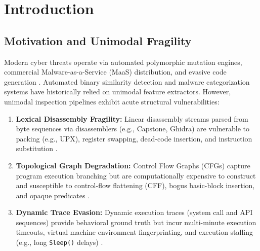 \documentclass[pdflatex,sn-mathphys-num]{sn-jnl}
\begin{document}
\section{Introduction}\label{sec:intro}

\subsection{Motivation and Unimodal Fragility}\label{sec:intro_motivation}
Modern cyber threats operate via automated polymorphic mutation engines, commercial Malware-as-a-Service (MaaS) distribution, and evasive code generation \cite{Gibert2020,Ni2018,Kim2023Revisiting,BinCola2024}. Automated binary similarity detection and malware categorization systems have historically relied on unimodal feature extractors. However, unimodal inspection pipelines exhibit acute structural vulnerabilities:
\begin{enumerate}
    \item \textbf{Lexical Disassembly Fragility:} Linear disassembly streams parsed from byte sequences via disassemblers (e.g., Capstone, Ghidra) are vulnerable to packing (e.g., UPX), register swapping, dead-code insertion, and instruction substitution \cite{Borello2014,Kim2023Revisiting,Tay2022Transformers}.
    \item \textbf{Topological Graph Degradation:} Control Flow Graphs (CFGs) capture program execution branching but are computationally expensive to construct and susceptible to control-flow flattening (CFF), bogus basic-block insertion, and opaque predicates \cite{Qiang2022,SHIELD2026,FewMHGCL2023}.
    \item \textbf{Dynamic Trace Evasion:} Dynamic execution traces (system call and API sequences) provide behavioral ground truth but incur multi-minute execution timeouts, virtual machine environment fingerprinting, and execution stalling (e.g., long \texttt{Sleep()} delays) \cite{Landman2021DeepHook,MalInsight2019,Alzaylaee2020}.
\end{enumerate}
\end{document}
